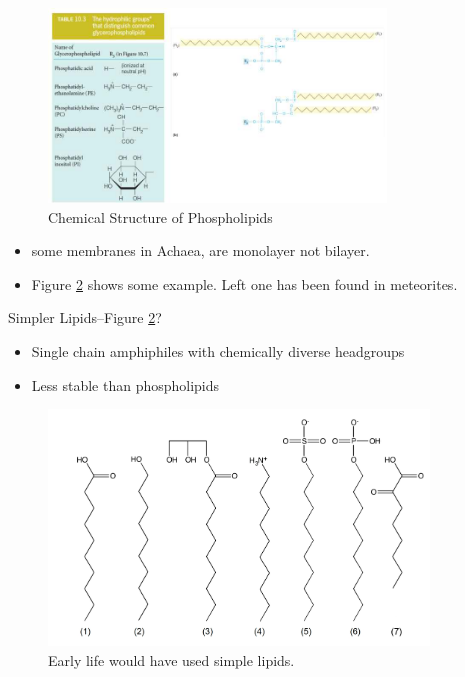 \documentclass[]{article}
\begin{document}
\begin{figure}[H]
	\caption{Chemical Structure of Phospholipids}\label{fig:Phospholipids}
	\includegraphics[width=0.8\textwidth]{Phospholipids}
\end{figure}

\begin{itemize}

	\item some membranes in Achaea, are monolayer not bilayer.
	\item Figure \ref{fig:SimplerLipids} shows some example. Left one has been found in meteorites.
\end{itemize}

Simpler Lipids--Figure \ref{fig:SimplerLipids}?
\begin{itemize}
	\item Single chain amphiphiles with  chemically diverse headgroups
	\item Less stable than phospholipids
\end{itemize}

\begin{figure}[H]
	\caption{Early life would have used simple lipids.}\label{fig:SimplerLipids} 
	\includegraphics[width=0.9\textwidth]{SimplerLipids}
\end{figure}
\end{document}
